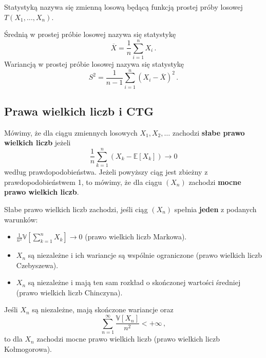 \documentclass{myclass}
\numberwithin{equation}{subsection}
\begin{document}
\begin{definition}[Statystyki]
Statystyką nazywa się zmienną losową będącą funkcją prostej próby losowej \(T(X_1,\ldots,X_n)\).
\end{definition}
Średnią w prostej próbie losowej nazywa się statystykę
\begin{equation}
    \overline{X} = \frac{1}{n}\sum_{i=1}^n X_i\,.
\end{equation}
Wariancją w prostej próbie losowej nazywa się statystykę
\begin{equation}
    S^2 = \frac{1}{n - 1}\sum_{i=1}^n (X_i - \overline{X})^2\,.
\end{equation}


\subsection{Prawa wielkich liczb i CTG}

\begin{definition}
Mówimy, że dla ciągu zmiennych losowych \(X_1,X_2,\ldots\) zachodzi \textbf{słabe prawo wielkich
liczb} jeżeli
\begin{equation*}
    \frac{1}{n} \sum_{k=1}^n\left(X_k - \mathbb{E}[X_k]\right) \to 0
\end{equation*}
według prawdopodobieństwa. Jeżeli powyższy ciąg jest zbieżny z prawdopodobieństwem 1, to mówimy, że
dla ciągu \((X_n)\) zachodzi \textbf{mocne prawo wielkich liczb}.
\end{definition}

\begin{theorem}
Słabe prawo wielkich liczb zachodzi, jeśli ciąg \((X_n)\) spełnia \textbf{jeden} z podanych
warunków:
\begin{itemize}

    \item \(\frac{1}{n^2}\mathbb{V}\left[\sum_{k=1}^n X_k\right] \to 0\) (prawo wielkich liczb
    Markowa).

    \item \(X_n\) są niezależne i ich wariancje są wspólnie ograniczone (prawo wielkich liczb
    Czebyszewa).

    \item \(X_n\) są niezależne i mają ten sam rozkład o skończonej wartości średniej (prawo
    wielkich liczb Chinczyna).
    
\end{itemize}
\end{theorem}

\begin{theorem}
Jeśli \(X_n\) są niezależne, mają skończone wariancje oraz
\begin{equation*}
    \sum_{n=1}^\infty \frac{\mathbb{V}[X_n]}{n^2} < +\infty\,,
\end{equation*}
to dla \(X_n\) zachodzi mocne prawo wielkich liczb (prawo wielkich liczb Kołmogorowa).
\end{theorem}
\end{document}
